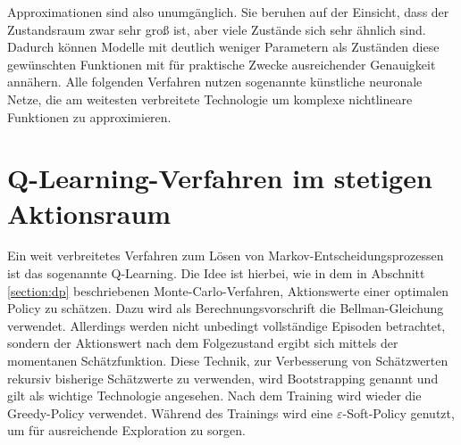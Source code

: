 Approximationen sind also unumgänglich.
Sie beruhen auf der Einsicht, dass der Zustandsraum zwar sehr groß ist, aber viele Zustände sich sehr ähnlich sind.
Dadurch können Modelle mit deutlich weniger Parametern als Zuständen diese gewünschten Funktionen  mit für praktische Zwecke ausreichender Genauigkeit annähern.
Alle folgenden Verfahren nutzen sogenannte künstliche neuronale Netze, die am weitesten verbreitete Technologie um komplexe nichtlineare Funktionen zu approximieren.

\section{Q-Learning-Verfahren im stetigen Aktionsraum}
Ein weit verbreitetes Verfahren zum Lösen von Markov-Entscheidungsprozessen ist das sogenannte Q-Learning.
Die Idee ist hierbei, wie in dem in Abschnitt \ref{section:dp} beschriebenen Monte-Carlo-Verfahren, Aktionswerte einer optimalen Policy zu schätzen.
Dazu wird als Berechnungsvorschrift die Bellman-Gleichung verwendet.
Allerdings werden nicht unbedingt vollständige Episoden betrachtet, sondern der Aktionswert nach dem Folgezustand ergibt sich mittels der momentanen Schätzfunktion.
Diese Technik, zur Verbesserung von Schätzwerten rekursiv bisherige Schätzwerte zu verwenden, wird Bootstrapping genannt und gilt als wichtige Technologie angesehen. \cite{Sutton1998}
Nach dem Training wird wieder die Greedy-Policy verwendet.
Während des Trainings wird eine $\varepsilon$-Soft-Policy genutzt, um für ausreichende Exploration zu sorgen.

